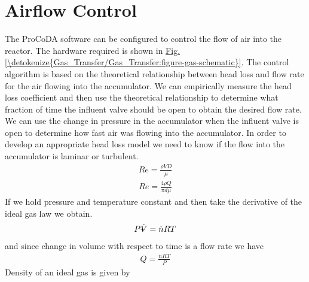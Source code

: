 \documentclass[letterpaper,10pt,english]{sphinxmanual}
\begin{document}
\section{Airflow Control}
\label{\detokenize{Gas_Transfer/Gas_Transfer:airflow-control}}\label{\detokenize{Gas_Transfer/Gas_Transfer:heading-gas-transfer-airflow-control}}
The ProCoDA software can be configured to control the flow of air into the reactor. The hardware required is shown in \hyperref[\detokenize{Gas_Transfer/Gas_Transfer:figure-gas-schematic}]{Fig.\@ \ref{\detokenize{Gas_Transfer/Gas_Transfer:figure-gas-schematic}}}. The control algorithm is based on the theoretical relationship between head loss and flow rate for the air flowing into the accumulator. We can empirically measure the head loss coefficient and then use the theoretical relationship to determine what fraction of time the influent valve should be open to obtain the desired flow rate. We can use the change in pressure in the accumulator when the influent valve is open to determine how fast air was flowing into the accumulator. In order to develop an appropriate head loss model we need to know if the flow into the accumulator is laminar or turbulent.
\begin{equation}\label{equation:Gas_Transfer/Gas_Transfer:eq_Gas_Re}
\begin{split} {Re}=\frac{\rho VD}{\mu }\end{split}
\end{equation}\begin{equation}\label{equation:Gas_Transfer/Gas_Transfer:Gas_Transfer/Gas_Transfer:9}
\begin{split}{Re}=\frac{4\rho Q}{\pi d\mu }\end{split}
\end{equation}
If we hold pressure and temperature constant and then take the derivative of the ideal gas law we obtain.
\begin{equation}\label{equation:Gas_Transfer/Gas_Transfer:Gas_Transfer/Gas_Transfer:10}
\begin{split}P\rlap{--}\dot{V}=\dot{n}RT\end{split}
\end{equation}
and since change in volume with respect to time is a flow rate we have
\begin{equation}\label{equation:Gas_Transfer/Gas_Transfer:eq_Gas_Qair}
\begin{split} Q=\frac{\dot{n}RT}{P}\end{split}
\end{equation}
Density of an ideal gas is given by
\end{document}

